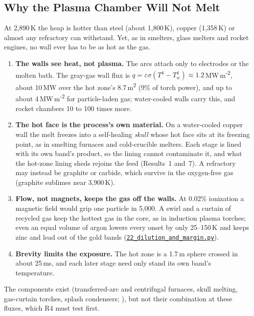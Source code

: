 \documentclass[11pt,a4paper]{article}
\newcommand{\gh}[2]{\href{https://github.com/syncaissa/paramanu-reclaimer/blob/main/#1}{\texttt{#2}}}
\theoremstyle{definition}
\theoremstyle{plain}
\theoremstyle{remark}
\begin{document}
\subsection{Why the Plasma Chamber Will Not Melt}\label{sec:walls}
At 2,890\,K the heap is hotter than steel (about 1,800\,K), copper (1,358\,K) or almost any refractory can withstand. Yet, as in smelters, glass melters and rocket engines, no wall ever has to be as hot as the gas.
\begin{enumerate}[nosep,leftmargin=*]
\item \textbf{The walls see heat, not plasma.} The arcs attach only to electrodes or the molten bath. The gray-gas wall flux is $q = \varepsilon\sigma(T^4 - T_w^4) \approx 1.2$\,MW\,m\textsuperscript{-2}, about 10\,MW over the hot zone's 8.7\,m\textsuperscript{2} (9\% of torch power), and up to about 4\,MW\,m\textsuperscript{-2} for particle-laden gas; water-cooled walls carry this, and rocket chambers 10 to 100 times more.
\item \textbf{The hot face is the process's own material.} On a water-cooled copper wall the melt freezes into a self-healing \emph{skull} whose hot face sits at its freezing point, as in smelting furnaces and cold-crucible melters. Each stage is lined with its own band's product, so the lining cannot contaminate it, and what the hot-zone lining sheds rejoins the feed (Results~1 and~7). A refractory may instead be graphite or carbide, which survive in the oxygen-free gas (graphite sublimes near 3,900\,K).
\item \textbf{Flow, not magnets, keeps the gas off the walls.} At 0.02\% ionization a magnetic field would grip one particle in 5,000. A swirl and a curtain of recycled gas keep the hottest gas in the core, as in induction plasma torches; even an equal volume of argon lowers every onset by only 25--150\,K and keeps zinc and lead out of the gold bands (\gh{simulation/scripts/22_dilution_and_margin.py}{22\_dilution\_and\_margin.py}).
\item \textbf{Brevity limits the exposure.} The hot zone is a 1.7\,m sphere crossed in about 25\,ms, and each later stage need only stand its own band's temperature.
\end{enumerate}
The components exist (transferred-arc and centrifugal furnaces, skull melting, gas-curtain torches, splash condensers; \citealp{cusano2017bref}), but not their combination at these fluxes, which R4 must test first.
\end{document}
